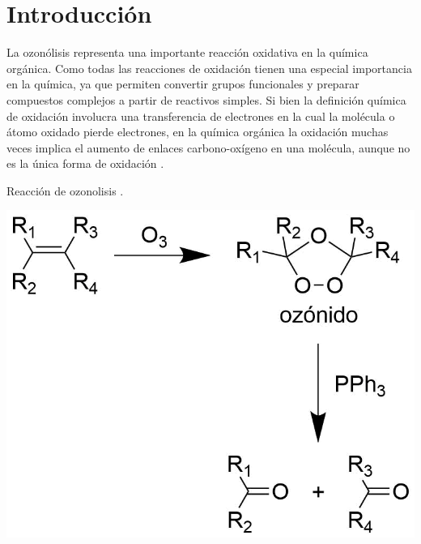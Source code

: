 \documentclass[fleqn,11pt]{SelfArx}
\begin{document}
\flushbottom %

\maketitle %


\thispagestyle{empty} %
\renewcommand{\tablename}{Tabla} 



\section*{Introducci\'on} %
La ozon\'olisis representa una importante reacci\'on oxidativa en la qu\'imica org\'anica. Como todas las reacciones de oxidaci\'on tienen una especial importancia en la qu\'imica, ya que permiten convertir grupos funcionales y preparar compuestos complejos a partir de reactivos simples. Si bien la definici\'on qu\'imica de oxidaci\'on involucra una transferencia de electrones en la cual la mol\'ecula o \'atomo oxidado pierde electrones, en la qu\'imica org\'anica la oxidaci\'on muchas veces implica el aumento de enlaces carbono-ox\'igeno en una mol\'ecula, aunque no es la \'unica forma de oxidaci\'on \cite{Gilbert2010}.
\begin{scheme}[h]
	\centering
	\caption{Reacci\'on de ozonolisis \cite{Wade2013}.}
	\includegraphics[width=0.7\linewidth]{structures/ozonolisis.png}
\end{scheme}
\end{document}
